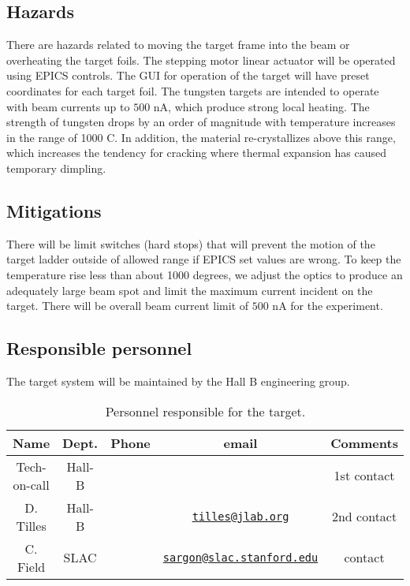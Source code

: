 \documentclass[11pt]{report}
\begin{document}
\subsection{Hazards} 

\indent

There are hazards related to moving the target frame into the beam or overheating the target foils. The stepping motor linear
actuator will be operated using EPICS controls.  The GUI for operation of the target will have preset coordinates for each target foil.  
The tungsten targets are intended to operate with beam currents up to $500$ nA, which produce strong local heating. The strength of tungsten drops by an order of magnitude with temperature increases in the range of 1000 C. In addition, the material re-crystallizes above
this range, which increases the tendency for cracking where thermal expansion has caused temporary dimpling. 

\subsection{Mitigations}

\indent

There will be limit switches (hard stops) that will prevent the motion of the target ladder outside of allowed range if EPICS set values are wrong. To keep the temperature rise less than about 1000 degrees, we adjust the optics to produce an adequately large beam spot and limit the maximum current incident on the target. There will be overall beam current limit of $500$ nA for the experiment.

\subsection{Responsible personnel}

\indent

The target system will be maintained by the Hall B engineering group.  

 \begin{table}[!htb]
 \centering
 \begin{tabular}{|c|c|c|c|c|}
\hline
 Name&Dept.&Phone&email&Comments \\ \hline
 Tech-on-call & Hall-B&&& 1st contact  \\ \hline
 D. Tilles & Hall-B&&\href{mailto:tilles@jlab.org}{\nolinkurl{tilles@jlab.org}}&2nd contact \\ \hline
C. Field& SLAC&&\href{mailto:sargon@slac.stanford.edu}{\nolinkurl{sargon@slac.stanford.edu}}&contact \\ \hline
 \end{tabular}
\caption{ Personnel responsible for the target.} 
\label{tb:target}
\end{table}
\end{document}
